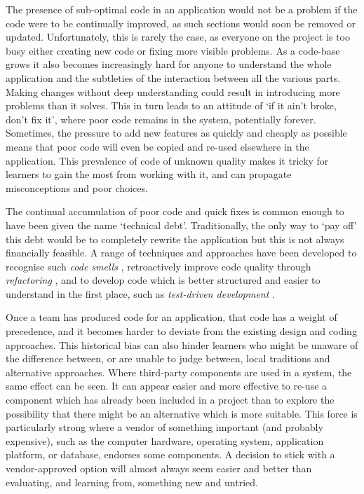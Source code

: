 The presence of sub-optimal code in an application would not be a problem if the code were to be continually improved, as such sections would soon be removed or updated. Unfortunately, this is rarely the case, as everyone on the project is too busy either creating new code or fixing more visible problems. As a code-base grows it also becomes increasingly hard for anyone to understand the whole application and the subtleties of the interaction between all the various parts. Making changes without deep understanding could result in introducing more problems than it solves. This in turn leads to an attitude of `if it ain't broke, don't fix it', where poor code remains in the system, potentially forever. Sometimes, the pressure to add new features as quickly and cheaply as possible means that poor code will even be copied and re-used elsewhere in the application. This prevalence of code of unknown quality makes it tricky for learners to gain the most from working with it, and can propagate misconceptions and poor choices.

The continual accumulation of poor code and quick fixes is common enough to have been given the name `technical debt'. Traditionally, the only way to `pay off' this debt would be to completely rewrite the application \citep{Brooks1995} but this is not always financially feasible. A range of techniques and approaches have been developed to recognise such \emph{code smells} \citep{Sharma2017}, retroactively improve code quality through \emph{refactoring} \citep{Fowler1999}, and to develop code which is better structured and easier to understand in the first place, such as \emph{test-driven development} \citep{Beck2022}.

Once a team has produced code for an application, that code has a weight of precedence, and it becomes harder to deviate from the existing design and coding approaches. This historical bias can also hinder learners who might be unaware of the difference between, or are unable to judge between, local traditions and alternative approaches. Where third-party components are used in a system, the same effect can be seen. It can appear easier and more effective to re-use a component which has already been included in a project than to explore the possibility that there might be an alternative which is more suitable. This force is particularly strong where a vendor of something important (and probably expensive), such as the computer hardware, operating system, application platform, or database, endorses some components. A decision to stick with a vendor-approved option will almost always seem easier and better than evaluating, and learning from, something new and untried.

